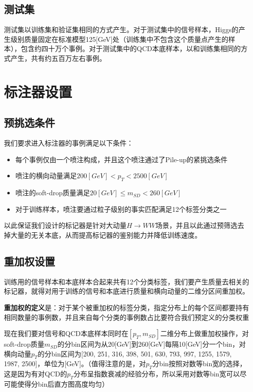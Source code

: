 \subsection{测试集}
测试集以训练集和验证集相同的方式产生。对于测试集中的信号样本，Higgs的产生级别质量固定在标准模型125[GeV]处（训练集中不包含这个质量点产生的样本），包含约四十万个事例。对于测试集中的QCD本底样本，以和训练集相同的方式产生，共有约五百万左右事例。


\section{标注器设置}
\subsection{预挑选条件}
我们要求进入标注器的事例满足以下条件：
\begin{itemize}
    \item 每个事例仅由一个喷注构成，并且这个喷注通过了Pile-up的紧挑选条件
    \item 喷注的横向动量满足$200[\si{GeV}]<p_T<2500[\si{GeV}]$
    \item 喷注的soft-drop质量满足$20[\si{GeV}]\leq m_{SD}<260[\si{GeV}]$
    \item 对于训练样本，喷注要通过粒子级别的事实匹配满足12个标签分类之一
\end{itemize}
以此保证我们设计的标记器是针对大动量$H\to WW$场景，并且以此通过预筛选去掉大量的无关本底，从而提高标记器的鉴别能力并降低训练速度。

\subsection{重加权设置}
训练用的信号样本和本底样本合起来共有12个分类标签，我们要产生质量去相关的标记器，就得对用于训练的信号和本底进行质量和横向动量的二维分区间重加权。

\textbf{重加权的定义}是：对于某个被重加权的标签分类，指定分布上的每个区间都要持有相同数量的事例数，并且来自每个分类的事例数占比要符合我们预定义的分类权重

现在我们要对信号和QCD本底样本同时在$[p_T,m_{SD}]$二维分布上做重加权操作，对soft-drop质量$m_{SD}$的分bin区间为从20[GeV]到260[GeV]每隔10[GeV]分一个bin，对横向动量$p_T$的分bin区间为[200, 251, 316, 398, 501, 630, 793, 997, 1255, 1579, 1987, 2500]，单位为[GeV]。（值得注意的是，对$p_T$分bin按照对数等bin宽的选择，这是因为有对QCD的$p_T$分布呈指数衰减的经验分布，所以采用对数等bin宽可以尽可能使得分bin后直方图高度均匀）

